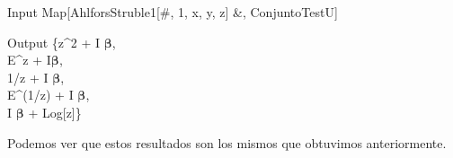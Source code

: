 \begin{mmaCell}{Input}
	 Map[AhlforsStruble1[#, 1, {x, y, z}] &, ConjuntoTestU]
\end{mmaCell}
\begin{mmaCell}{Output}
	 \{z^2 + I \(\pmb{\beta}\),\\ E^z + I\(\pmb{\beta}\),\\ 1/z + I \(\pmb{\beta}\),\\ E^(1/z) + I \(\pmb{\beta}\),\\ I \(\pmb{\beta}\) + Log[z]\}
\end{mmaCell}
\noindent Podemos ver que estos resultados son los mismos que obtuvimos anteriormente.





















 